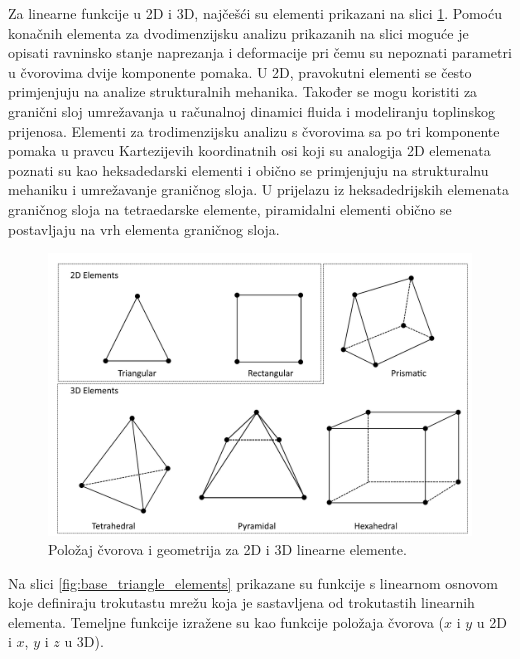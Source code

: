 \documentclass[a4paper,twoside,12pt]{memoir} %
\begin{document}
Za linearne funkcije u 2D i 3D, najčešći su elementi prikazani na slici \ref{fig:2d_i_3d_elementi}. Pomoću konačnih elementa za dvodimenzijsku analizu prikazanih na slici moguće je opisati ravninsko stanje naprezanja i deformacije pri čemu su nepoznati parametri u čvorovima dvije komponente pomaka. U 2D, pravokutni elementi se često primjenjuju na analize strukturalnih mehanika. Također se mogu koristiti za granični sloj umrežavanja u računalnoj dinamici fluida i modeliranju toplinskog prijenosa. Elementi za trodimenzijsku analizu s čvorovima sa po tri komponente pomaka u pravcu Kartezijevih koordinatnih osi koji su analogija 2D elemenata poznati su kao heksadedarski elementi i obično se primjenjuju na strukturalnu mehaniku i umrežavanje graničnog sloja. U prijelazu iz heksadedrijskih elemenata graničnog sloja na tetraedarske elemente, piramidalni elementi obično se postavljaju na vrh elementa graničnog sloja.

\begin{figure}[h!t]
\begin{center}
\includegraphics[scale=0.47]{pictures/chapter_fem/geometry-and-nodes-linear-elements.png}
\caption{Položaj čvorova i geometrija za 2D i 3D linearne elemente. \cite{comsol_fem_general}}
\label{fig:2d_i_3d_elementi}
\end{center}
\end{figure}

Na slici \ref{fig:base_triangle_elements} prikazane su funkcije s linearnom osnovom koje definiraju trokutastu mrežu koja je sastavljena od trokutastih linearnih elementa. Temeljne funkcije izražene su kao funkcije položaja čvorova ($x$ i $y$ u 2D i $x$, $y$ i $z$ u 3D).
\end{document}
